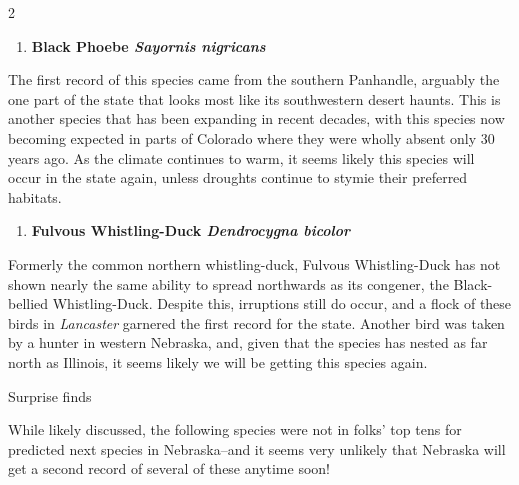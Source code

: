 \documentclass[10pt,letterpaper]{article}
\newcommand{\NewsItem}[1]{%
		\fontspec{QTBrushStroke}
		\large #1 \vspace{4pt}
		\par \normalsize \normalfont}
\begin{document}
\begin{multicols}{2}
	\begin{enumerate}[resume]
		\item \textbf{Black Phoebe \textit{Sayornis nigricans}}
	\end{enumerate}
	The first record of this species came from the southern Panhandle, arguably the one part of the state that looks most like its southwestern desert haunts. This is another species that has been expanding in recent decades, with this species now becoming expected in parts of Colorado where they were wholly absent only 30 years ago. As the climate continues to warm, it seems likely this species will occur in the state again, unless droughts continue to stymie their preferred habitats.
	
	\begin{enumerate}[resume]
		\item \textbf{Fulvous Whistling-Duck \textit{Dendrocygna bicolor}}
	\end{enumerate}
	Formerly the common northern whistling-duck, Fulvous Whistling-Duck has not shown nearly the same ability to spread northwards as its congener, the Black-bellied Whistling-Duck. Despite this, irruptions still do occur, and a flock of these birds in \textit{Lancaster} garnered the first record for the state. Another bird was taken by a hunter in western Nebraska, and, given that the species has nested as far north as Illinois, it seems likely we will be getting this species again.
	
\end{multicols}
	\vspace{0.5cm}
	\noindent \NewsItem{Surprise finds}
	\noindent While likely discussed, the following species were not in folks' top tens for predicted next species in Nebraska--and it seems very unlikely that Nebraska will get a second record of several of these anytime soon!
\end{document}
